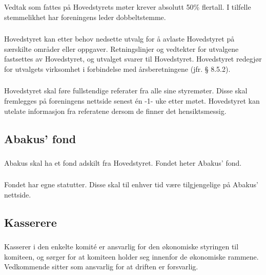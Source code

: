 \subsubsection{}
Vedtak som fattes på Hovedstyrets møter krever absolutt 50\% flertall. I
tilfelle stemmelikhet har foreningens leder dobbeltstemme.

\subsubsection{}
Hovedstyret kan etter behov nedsette utvalg for å avlaste Hovedstyret på
særskilte områder eller oppgaver. Retningslinjer og vedtekter for utvalgene
fastsettes av Hovedstyret, og utvalget svarer til Hovedstyret. Hovedstyret
redegjør for utvalgets virksomhet i forbindelse med årsberetningene (jfr. §
8.5.2).

\subsubsection{}
Hovedstyret skal føre fullstendige referater fra alle sine styremøter. Disse
skal fremlegges på foreningens nettside senest én -1- uke etter møtet.
Hovedstyret kan utelate informasjon fra referatene dersom de finner det
hensiktsmessig.

\subsection{Abakus’ fond}

\subsubsection{}
Abakus skal ha et fond adskilt fra Hovedstyret. Fondet heter Abakus’ fond.

\subsubsection{}
Fondet har egne statutter. Disse skal til enhver tid være tilgjengelige på
Abakus’ nettside.

\subsection{Kasserere}

\subsubsection{}
Kasserer i den enkelte komité er ansvarlig for den økonomiske styringen til
komiteen, og sørger for at komiteen holder seg innenfor de økonomiske rammene.
Vedkommende sitter som ansvarlig for at driften er forsvarlig.

